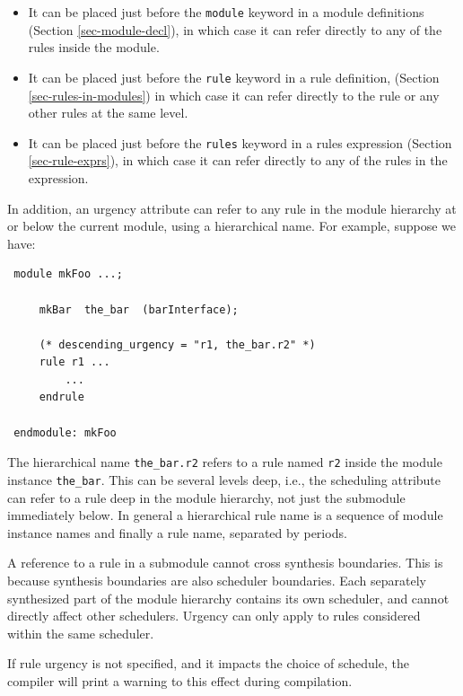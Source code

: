 \documentclass[twoside,letterpaper]{article}
\newcommand{\te}[1]{\texttt{#1}}
\begin{document}
\begin{itemize}\label{attr-position}


\item
It can be placed just before the \te{module} keyword in a
module definitions (Section
{\ref{sec-module-decl}}), in which case it can refer directly to any
of the rules inside the module.


\item
It can be placed just before the \te{rule} keyword in a
rule definition, (Section
{\ref{sec-rules-in-modules}}) %
in which case it can refer directly to
the rule or any other rules at the same level.

\item
It can be placed just before the \te{rules} keyword in a
rules expression (Section
{\ref{sec-rule-exprs}}), in which case it can refer directly to any of
the rules in the expression.


\end{itemize}

In addition, an urgency attribute can refer to any rule in the module
hierarchy at or below the current module, using a hierarchical name.
For example, suppose we have:

\begin{verbatim}
 module mkFoo ...;

     mkBar  the_bar  (barInterface);

     (* descending_urgency = "r1, the_bar.r2" *)
     rule r1 ...
         ...
     endrule

 endmodule: mkFoo
\end{verbatim}
The hierarchical name \te{the\_bar.r2} refers to a rule named \te{r2}
inside the module instance \te{the\_bar}.  This can be several levels
deep, i.e., the scheduling attribute can refer to a rule deep in the
module hierarchy, not just the submodule immediately below.  In
general a hierarchical rule name is a sequence of module instance
names and finally a rule name, separated by periods.

A reference to a rule in a submodule cannot cross synthesis
boundaries.  This is because synthesis boundaries are also scheduler
boundaries.  Each separately synthesized part of the module hierarchy
contains its own scheduler, and cannot directly affect other
schedulers.  Urgency can only apply to rules considered within the
same scheduler.

If rule urgency is not specified, and it impacts the choice of
schedule, the compiler will print a warning to this effect during
compilation.
\end{document}
